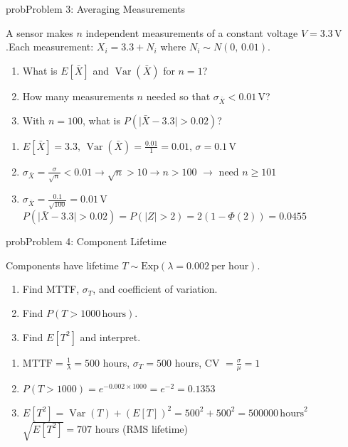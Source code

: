 \begin{PSbox}[unbreakable]{prob}{Problem 3: Averaging Measurements}

A sensor makes $n$ independent measurements of a constant voltage $V = 3.3\,\mathrm{V}$.\PSbr{}Each measurement: $X_{i} = 3.3 + N_{i}$ where $N_{i} \sim N(0,\, 0.01)$.

\begin{enumerate}
\def\labelenumi{(\alph{enumi})}
\tightlist
\item
  What is $E[\bar{X}]$ and $\operatorname{Var}(\bar{X})$ for $n = 1$?
\item
  How many measurements $n$ needed so that $\sigma_{\bar{X}} < 0.01\,\mathrm{V}$?
\item
  With $n = 100$, what is $P(\lvert \bar{X} - 3.3\rvert > 0.02)$?
\end{enumerate}

\PSsolution{} 

\begin{enumerate}
\def\labelenumi{(\alph{enumi})}
\item
  $\displaystyle E[\bar{X}] = 3.3,\, \operatorname{Var}(\bar{X}) = \frac{0.01}{1} = 0.01,\, \sigma = 0.1\,\mathrm{V}$
\item
  $\sigma_{\bar{X}} = \frac{\sigma}{\sqrt{n}} < 0.01 \to \sqrt{n} > 10 \to n > 100$ \ensuremath{\to} need $n \ge 101$
\item
  $\displaystyle \sigma_{\bar{X}} = \frac{0.1}{\sqrt{100}} = 0.01\,\mathrm{V}$\PSbr{}$P(\lvert \bar{X} - 3.3\rvert > 0.02) = P(\lvert Z\rvert > 2) = 2(1-\Phi (2)) = 0.0455$
\end{enumerate}

\end{PSbox}

\begin{PSbox}[unbreakable]{prob}{Problem 4: Component Lifetime}

Components have lifetime $T \sim \mathrm{Exp}(\lambda = 0.002\ \text{per hour})$.

\begin{enumerate}
\def\labelenumi{(\alph{enumi})}
\tightlist
\item
  Find MTTF, $\sigma_{T}$, and coefficient of variation.
\item
  Find $P(T > 1000\,\mathrm{hours})$.
\item
  Find $E[T^{2}]$ and interpret.
\end{enumerate}

\PSsolution{} 

\begin{enumerate}
\def\labelenumi{(\alph{enumi})}
\item
  $\mathrm{MTTF} = \frac{1}{\lambda} = 500$ hours, $\sigma_{T} = 500$ hours, CV $= \frac{\sigma}{\mu} = 1$
\item
  $P(T > 1000) = e^{-0.002 \times 1000} = e^{-2} = 0.1353$
\item
  $E[T^{2}] = \operatorname{Var}(T) + (E[T])^{2} = 500^{2} + 500^{2} = 500000\,\mathrm{hours}^{2}$\PSbr{}$\sqrt{E[T^{2}]} = 707$ hours (RMS lifetime)
\end{enumerate}

\end{PSbox}

